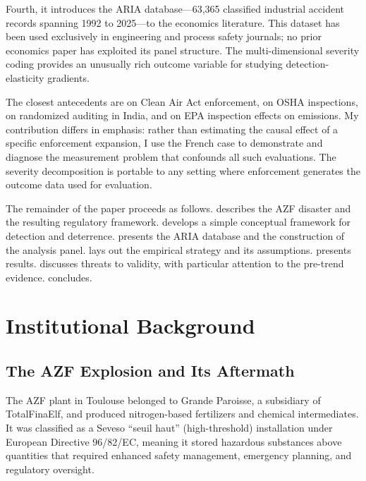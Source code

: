 \documentclass[12pt]{article}
\begin{document}
Fourth, it introduces the ARIA database---63,365 classified industrial accident records spanning 1992 to 2025---to the economics literature. This dataset has been used exclusively in engineering and process safety journals; no prior economics paper has exploited its panel structure. The multi-dimensional severity coding provides an unusually rich outcome variable for studying detection-elasticity gradients.

The closest antecedents are \citet{greenstone2002} on Clean Air Act enforcement, \citet{gray1993} on OSHA inspections, \citet{duflo2013,duflo2018} on randomized auditing in India, and \citet{hanna2014} on EPA inspection effects on emissions. My contribution differs in emphasis: rather than estimating the causal effect of a specific enforcement expansion, I use the French case to demonstrate and diagnose the measurement problem that confounds all such evaluations. The severity decomposition is portable to any setting where enforcement generates the outcome data used for evaluation.

The remainder of the paper proceeds as follows.  describes the AZF disaster and the resulting regulatory framework.  develops a simple conceptual framework for detection and deterrence.  presents the ARIA database and the construction of the analysis panel.  lays out the empirical strategy and its assumptions.  presents results.  discusses threats to validity, with particular attention to the pre-trend evidence.  concludes.


\section{Institutional Background}
\label{sec:background}

\subsection{The AZF Explosion and Its Aftermath}

The AZF plant in Toulouse belonged to Grande Paroisse, a subsidiary of TotalFinaElf, and produced nitrogen-based fertilizers and chemical intermediates. It was classified as a Seveso ``seuil haut'' (high-threshold) installation under European Directive 96/82/EC, meaning it stored hazardous substances above quantities that required enhanced safety management, emergency planning, and regulatory oversight.
\end{document}
